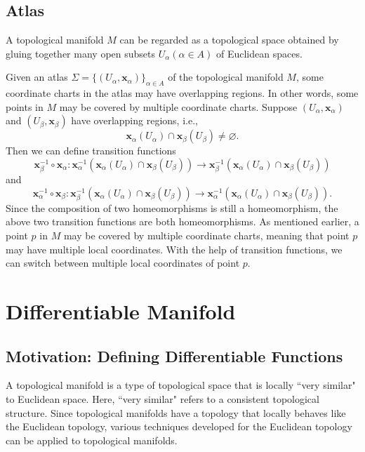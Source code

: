 \documentclass{report}
\begin{document}
\subsection{Atlas}
A topological manifold $M$ can be regarded as a topological space obtained by gluing together many open subsets $U_\alpha(\alpha\in A)$ of Euclidean spaces.

Given an atlas $\Sigma=\{(U_\alpha,\mathbf{x}_\alpha)\}_{\alpha\in
    A}$ of the topological manifold $M$, some coordinate charts in the atlas may have overlapping regions. In other words, some points in $M$ may be covered by multiple coordinate charts. Suppose $(U_\alpha,\mathbf{x}_\alpha)$ and $(U_\beta,\mathbf{x}_\beta)$ have overlapping regions, i.e.,
\[
    \mathbf{x}_\alpha(U_\alpha)\cap \mathbf{x}_\beta(U_\beta)\ne\varnothing.
\]
Then we can define transition functions
\[
    \mathbf{x}^{-1}_\beta\circ \mathbf{x}_{\alpha}:
    \mathbf{x}^{-1}_\alpha(\mathbf{x}_\alpha(U_\alpha)\cap
    \mathbf{x}_\beta(U_\beta)) \longrightarrow
    \mathbf{x}^{-1}_\beta(\mathbf{x}_\alpha(U_\alpha)\cap
    \mathbf{x}_\beta(U_\beta))
\]
and
\[
    \mathbf{x}^{-1}_{\alpha}\circ
    \mathbf{x}_\beta:  \mathbf{x}^{-1}_\beta(\mathbf{x}_\alpha(U_\alpha)\cap
    \mathbf{x}_\beta(U_\beta))\longrightarrow
    \mathbf{x}^{-1}_\alpha(\mathbf{x}_\alpha(U_\alpha)\cap
    \mathbf{x}_\beta(U_\beta)).
\]
Since the composition of two homeomorphisms is still a homeomorphism, the above two transition functions are both homeomorphisms. As mentioned earlier, a point $p$ in $M$ may be covered by multiple coordinate charts, meaning that point $p$ may have multiple local coordinates. With the help of transition functions, we can switch between multiple local coordinates of point $p$.

\section{Differentiable Manifold}
\subsection{Motivation: Defining Differentiable Functions}
A topological manifold is a type of topological space that is locally ``very similar" to Euclidean space. Here, ``very similar" refers to a consistent topological structure. Since topological manifolds have a topology that locally behaves like the Euclidean topology, various techniques developed for the Euclidean topology can be applied to topological manifolds. 
\end{document}
